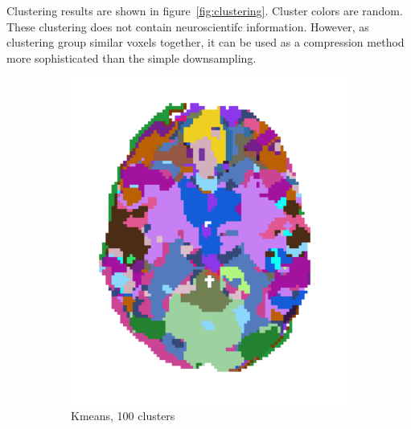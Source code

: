 \documentclass{frontiersSCNS} %
\begin{document}
Clustering results are shown in figure~\ref{fig:clustering}. Cluster colors are
random. These clustering does not contain neuroscientifc information. However,
as clustering group similar voxels together, it can be used as a compression
method more sophisticated than the simple downsampling.

\begin{figure}[hbtp]
      \begin{subfigure}[b]{.23\linewidth}
          \includegraphics[width=\linewidth]{img/clustering/kmeans_100}
        \caption{Kmeans, 100 clusters}
      \end{subfigure}
      \hfill
      \begin{subfigure}[b]{.23\linewidth}

\end{subfigure}
\end{figure}
\end{document}
